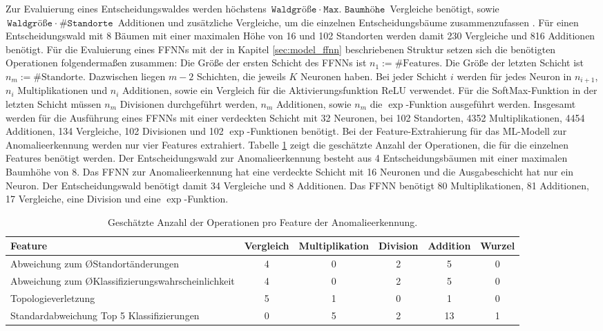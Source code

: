 \newline
\newline
Zur Evaluierung eines Entscheidungswaldes werden höchstens
\newline
$\texttt{Waldgröße}\ \cdot\ \texttt{Max. Baumhöhe}$ Vergleiche benötigt,
sowie $\texttt{Waldgröße}\ \cdot\ \texttt{\#Standorte}$ Additionen und  zusätzliche Vergleiche, um die einzelnen Entscheidungsbäume zusammenzufassen \cite{dymelThesis}.
Für einen Entscheidungswald mit 8 Bäumen mit einer maximalen Höhe von 16 und 102 Standorten werden damit 230 Vergleiche und 816 Additionen benötigt.
\newpage
Für die Evaluierung eines FFNNs mit der in Kapitel \ref{sec:model_ffnn} beschriebenen Struktur setzen sich die benötigten Operationen folgendermaßen zusammen:
Die Größe der ersten Schicht des FFNNs ist $n_1:=\text{\#Features}$.
Die Größe der letzten Schicht ist $n_m:=\text{\#Standorte}$.
Dazwischen liegen $m-2$ Schichten, die jeweils $K$ Neuronen haben.
Bei jeder Schicht $i$ werden für jedes Neuron in $n_{i+1}$, $n_i$ Multiplikationen und $n_i$ Additionen, sowie ein Vergleich für die Aktivierungsfunktion ReLU verwendet.
Für die SoftMax-Funktion in der letzten Schicht müssen $n_m$ Divisionen durchgeführt werden, $n_m$ Additionen, sowie $n_m$ die $\exp$-Funktion ausgeführt werden.
Insgesamt werden für die Ausführung eines FFNNs mit einer verdeckten Schicht mit 32 Neuronen,
bei 102 Standorten, 4352 Multiplikationen, 4454 Additionen, 134 Vergleiche, 102 Divisionen und 102 $\exp$-Funktionen benötigt.
\newline
\newline
Bei der Feature-Extrahierung für das ML-Modell zur Anomalieerkennung werden nur vier Features extrahiert.
Tabelle \ref{tab:anomaly_feature_operation_complexity} zeigt die geschätzte Anzahl der Operationen, die für die einzelnen Features benötigt werden.
Der Entscheidungswald zur Anomalieerkennung besteht aus 4 Entscheidungsbäumen mit einer maximalen Baumhöhe von 8.
Das FFNN zur Anomalieerkennung hat eine verdeckte Schicht mit 16 Neuronen und die Ausgabeschicht hat nur ein Neuron.
Der Entscheidungswald benötigt damit 34 Vergleiche und 8 Additionen.
Das FFNN benötigt 80 Multiplikationen, 81 Additionen, 17 Vergleiche, eine Division und eine $\exp$-Funktion.
\begin{table}[h!]
    \centering
    \begin{tabular}{ | p{4.5cm} | c | c | c | c | c | }
        \hline
        Feature & Vergleich & Multiplikation & Division & Addition & Wurzel \\\hline
        Abweichung zum ØStandortänderungen & 4 & 0 & 2 & 5 & 0 \\\hline
        Abweichung zum ØKlassifizierungswahrscheinlichkeit & 4 & 0 & 2 & 5 & 0 \\\hline
        Topologieverletzung & 5 & 1 & 0 & 1 & 0 \\\hline
        Standardabweichung Top 5 Klassifizierungen & 0 & 5 & 2 & 13 & 1 \\\hline
    \end{tabular}
    \caption{Geschätzte Anzahl der Operationen pro Feature der Anomalieerkennung.}
    \label{tab:anomaly_feature_operation_complexity}
\end{table}
